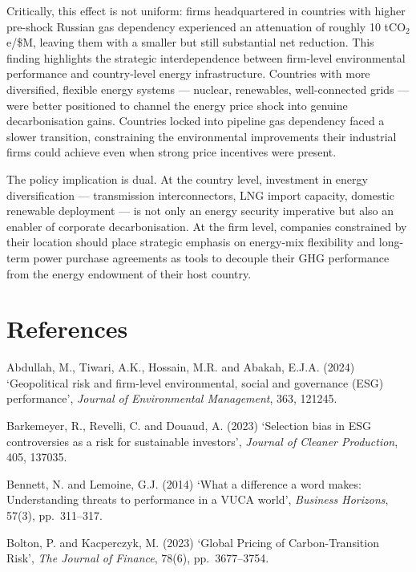 \documentclass[12pt,a4paper]{article}
\begin{document}
Critically, this effect is not uniform: firms headquartered in countries with higher pre-shock Russian gas dependency experienced an attenuation of roughly 10 tCO$_2$e/\$M, leaving them with a smaller but still substantial net reduction. This finding highlights the strategic interdependence between firm-level environmental performance and country-level energy infrastructure. Countries with more diversified, flexible energy systems — nuclear, renewables, well-connected grids — were better positioned to channel the energy price shock into genuine decarbonisation gains. Countries locked into pipeline gas dependency faced a slower transition, constraining the environmental improvements their industrial firms could achieve even when strong price incentives were present.

The policy implication is dual. At the country level, investment in energy diversification — transmission interconnectors, LNG import capacity, domestic renewable deployment — is not only an energy security imperative but also an enabler of corporate decarbonisation. At the firm level, companies constrained by their location should place strategic emphasis on energy-mix flexibility and long-term power purchase agreements as tools to decouple their GHG performance from the energy endowment of their host country.

\section*{References}

\setlength{\parindent}{0pt}

Abdullah, M., Tiwari, A.K., Hossain, M.R. and Abakah, E.J.A. (2024) `Geopolitical risk and firm-level environmental, social and governance (ESG) performance', \textit{Journal of Environmental Management}, 363, 121245.

Barkemeyer, R., Revelli, C. and Douaud, A. (2023) `Selection bias in ESG controversies as a risk for sustainable investors', \textit{Journal of Cleaner Production}, 405, 137035.

Bennett, N. and Lemoine, G.J. (2014) `What a difference a word makes: Understanding threats to performance in a VUCA world', \textit{Business Horizons}, 57(3), pp.\ 311--317.

Bolton, P. and Kacperczyk, M. (2023) `Global Pricing of Carbon-Transition Risk', \textit{The Journal of Finance}, 78(6), pp.\ 3677--3754.
\end{document}
